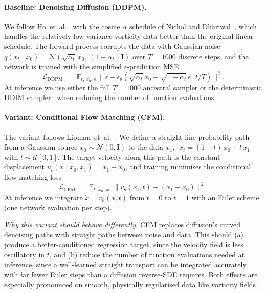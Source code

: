 \documentclass{article}
\begin{document}
\paragraph{Baseline: Denoising Diffusion (DDPM).} We follow
Ho~et~al.~\cite{ho2020ddpm} with the cosine $\bar\alpha$ schedule of
Nichol and Dhariwal~\cite{nichol2021improved}, which handles the
relatively low-variance vorticity data better than the original linear
schedule. The forward process corrupts the data with Gaussian noise
$q(x_t \mid x_0) = \mathcal{N}\!\left(\sqrt{\bar\alpha_t}\, x_0,\,(1-\bar\alpha_t) \mathbf{I}\right)$
over $T=1000$ discrete steps, and the network is trained with the simplified
$\epsilon$-prediction MSE
\[
\mathcal{L}_{\mathrm{DDPM}} \;=\;
\mathbb{E}_{t,\,x_0,\,\epsilon}\,
\bigl\lVert \epsilon - \epsilon_\theta\!\left(\sqrt{\bar\alpha_t}\, x_0
+ \sqrt{1-\bar\alpha_t}\,\epsilon,\, t/T \right) \bigr\rVert^2.
\]
At inference we use either the full $T=1000$ ancestral sampler or the
deterministic DDIM sampler~\cite{song2021ddim} when reducing the number of
function evaluations.

\paragraph{Variant: Conditional Flow Matching (CFM).} The variant follows
Lipman~et~al.~\cite{lipman2023flow}. We define a straight-line probability
path from a Gaussian source $x_0\!\sim\!\mathcal{N}(0,\mathbf{I})$ to the data
$x_1$, $\;x_t = (1-t)\,x_0 + t\,x_1$ with $t\sim\mathcal{U}[0,1]$. The target
velocity along this path is the constant displacement $u_t(x\mid x_0, x_1)
= x_1 - x_0$, and training minimises the conditional flow-matching loss
\[
\mathcal{L}_{\mathrm{CFM}} \;=\;
\mathbb{E}_{t,\,x_0,\,x_1}\,
\bigl\lVert v_\theta(x_t, t) - (x_1 - x_0) \bigr\rVert^2.
\]
At inference we integrate $\dot x = v_\theta(x,t)$ from $t=0$ to $t=1$ with an
Euler scheme (one network evaluation per step).

\emph{Why this variant should behave differently.} CFM replaces diffusion's
curved denoising paths with straight paths between noise and data. This
should (a) produce a better-conditioned regression target, since the velocity
field is less oscillatory in $t$, and (b) reduce the number of function
evaluations needed at inference, since a well-learned straight transport
can be integrated accurately with far fewer Euler steps than a diffusion
reverse-SDE requires. Both effects are especially pronounced on smooth,
physically regularised data like vorticity fields.
\end{document}
